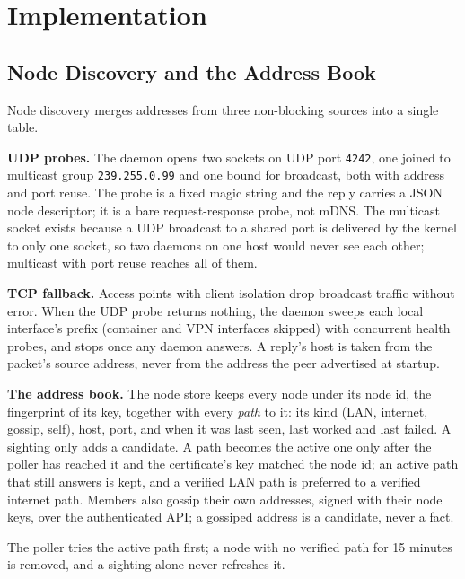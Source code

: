 \chapter{Implementation}
\label{chap:design}

\section{Node Discovery and the Address Book}
\label{sec:discovery}

Node discovery merges addresses from three non-blocking sources into a single table.

\textbf{UDP probes.} The daemon opens two sockets on UDP port \texttt{4242}, one
joined to multicast group \texttt{239.255.0.99} and one bound for broadcast,
both with address and port reuse. The probe is a fixed magic string and the
reply carries a JSON node descriptor; it is a bare request-response probe, not
mDNS. The multicast socket exists because a UDP broadcast to a shared port is
delivered by the kernel to only one socket, so two daemons on one host would
never see each other; multicast with port reuse reaches all of them.

\textbf{TCP fallback.} Access points with client isolation drop broadcast
traffic without error. When the UDP probe returns nothing, the daemon sweeps
each local interface's prefix (container and VPN interfaces skipped) with
concurrent health probes, and stops once any daemon answers. A reply's host is taken from the packet's source
address, never from the address the peer advertised at startup.

\textbf{The address book.} The node store keeps every node under its node id,
the fingerprint of its key, together with every \emph{path} to it: its kind
(LAN, internet, gossip, self), host, port, and when it was last seen, last
worked and last failed. A sighting only adds a candidate. A path becomes the
active one only after the poller has reached it and the certificate's key
matched the node id; an active path that still answers is kept, and a verified
LAN path is preferred to a verified internet path. Members also gossip their own
addresses, signed with their node keys, over the authenticated API; a gossiped
address is a candidate, never a fact.

The poller tries the active path first; a node with no verified path for 15
minutes is removed, and a sighting alone never refreshes it.

